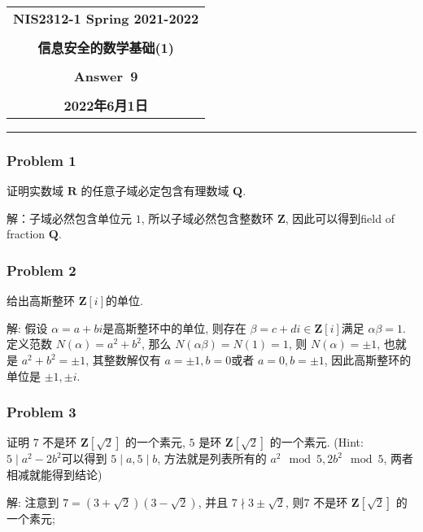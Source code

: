 \documentclass[a4paper,12pt]{ctexart}
\newcommand{\Z}{\mathbf{Z}}
\newcommand{\Q}{\mathbf{Q}}
\newcommand{\R}{\mathbf{R}}
\begin{document}
  \begin{center}

  \vspace{-0.3in}
  \begin{tabular}{c}
    \textbf{\Large NIS2312-1 Spring 2021-2022} \\
    \textbf{\Large  } \\
    \textbf{\Large  信息安全的数学基础(1)}\\
    \textbf{\Large  } \\
    \textbf{\Large  Answer~9 } \\
    \textbf{\Large  } \\
    \textbf{\Large 2022年6月1日} \\
  \end{tabular}
  \end{center}
  \noindent
  \rule{\linewidth}{0.4pt}

\subsubsection*{Problem 1}
    证明实数域 $ \R $ 的任意子域必定包含有理数域 $ \Q $.

    解：子域必然包含单位元 $ 1 $, 所以子域必然包含整数环 $ \Z $, 因此可以得到field of fraction $ \Q $. 
\subsubsection*{Problem 2}
    给出高斯整环 $ \Z[i] $的单位.

    解: 假设 $ \alpha=a+bi $是高斯整环中的单位, 则存在 $ \beta=c+di\in\Z[i] $满足 $ \alpha\beta=1 $. 定义范数 $ N(\alpha)=a^2+b^2 $,
    那么 $ N(\alpha\beta)=N(1)=1 $, 则 $ N(\alpha)=\pm 1 $, 也就是 $ a^2+b^2=\pm 1 $, 其整数解仅有 $ a=\pm 1,b=0 $或者 $ a=0,b=\pm 1 $, 
    因此高斯整环的单位是 $ \pm 1,\pm i $.
\subsubsection*{Problem 3}
    证明 $ 7 $ 不是环 $ \Z[\sqrt{2}] $ 的一个素元, $ 5 $ 是环 $ \Z[\sqrt{2}] $ 的一个素元.
    (Hint: $ 5\mid a^2-2b^2 $可以得到 $ 5\mid a,5\mid b $, 方法就是列表所有的 $ a^2 \mod{5},2b^2\mod{5} $, 两者相减就能得到结论)

    解: 注意到 $ 7=(3+\sqrt{2})(3-\sqrt{2}) $, 并且 $ 7\nmid 3\pm\sqrt{2} $, 则$ 7 $ 不是环 $ \Z[\sqrt{2}] $ 的一个素元;
\end{document}
